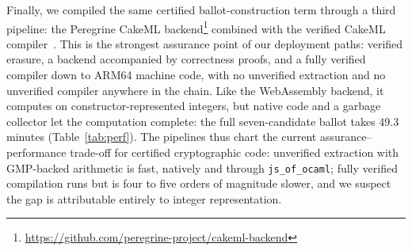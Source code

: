 \documentclass[sigconf,anonymous,review]{acmart}
\begin{document}
Finally, we compiled the same certified ballot-construction term through a third pipeline: the Peregrine CakeML backend\footnote{\url{https://github.com/peregrine-project/cakeml-backend}} combined with the verified CakeML compiler~\cite{10.1145/2535838.2535841}. This is the strongest assurance point of our deployment paths: verified erasure, a backend accompanied by correctness proofs, and a fully verified compiler down to ARM64 machine code, with no unverified extraction and no unverified compiler anywhere in the chain. Like the WebAssembly backend, it computes on constructor-represented integers, but native code and a garbage collector let the computation complete: the full seven-candidate ballot takes 49.3 minutes (Table~\ref{tab:perf}). The pipelines thus chart the current assurance--performance trade-off for certified cryptographic code: unverified extraction with GMP-backed arithmetic is fast, natively and through \texttt{js\_of\_ocaml}; fully verified compilation runs but is four to five orders of magnitude slower, and we suspect the gap is attributable entirely to integer representation. 
\end{document}
